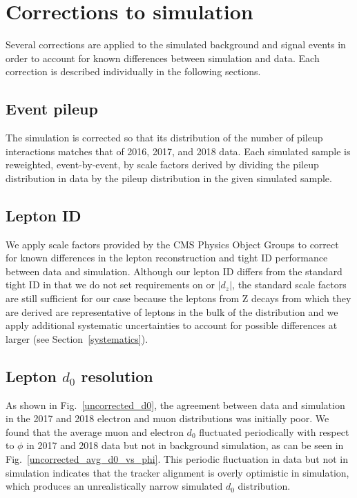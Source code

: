 \section{Corrections to simulation}
\label{corrections}

Several corrections are applied to the simulated background and signal events in order to account for known differences between simulation and data. Each correction is described individually in the following sections.

\subsection{Event pileup}
The  simulation is corrected so that its distribution of the number of pileup interactions matches that of 2016, 2017, and 2018 data. Each simulated sample is reweighted, event-by-event, by scale factors derived by dividing the pileup distribution in data by the pileup distribution in the given simulated sample.

\subsection{Lepton ID}
We apply scale factors provided by the CMS Physics Object Groups to correct for known differences in the lepton reconstruction and tight ID performance between data and simulation. Although our lepton ID differs from the standard tight ID in that we do not set requirements on \ad or $|d_{z}|$, the standard scale factors are still sufficient for our case because the leptons from Z decays from which they are derived are representative of leptons in the bulk of the \ad distribution and we apply additional systematic uncertainties to account for possible differences at larger \ad (see Section~\ref{systematics}).

\subsection{Lepton $d_0$ resolution}
\label{d0_smearing}
As shown in Fig.~\ref{uncorrected_d0}, the agreement between data and simulation in the 2017 and 2018 electron and muon \ad distributions was initially poor. We found that the average muon and electron $d_0$ fluctuated periodically with respect to $\phi$ in 2017 and 2018 data but not in background simulation, as can be seen in Fig.~\ref{uncorrected_avg_d0_vs_phi}. This periodic fluctuation in data but not in simulation indicates that the tracker alignment is overly optimistic in simulation, which produces an unrealistically narrow simulated $d_0$ distribution.

